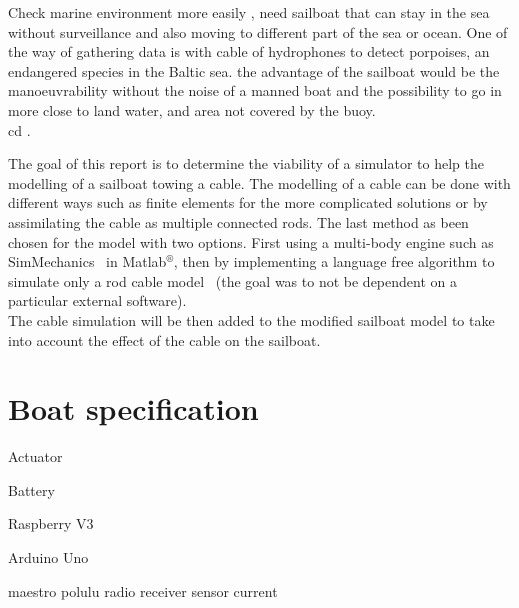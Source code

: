 Check marine environment more easily , need sailboat that can stay in the sea without surveillance 
and also moving to different part of the sea or ocean. One of the way of gathering data is with cable of 
hydrophones to detect porpoises, an endangered species in the Baltic sea. the advantage of the sailboat would be the manoeuvrability without the noise of a manned boat and the possibility to go in more close to land water, and area not covered by the buoy.\\
cd .


The goal of this report is to determine the viability of a simulator to help
the modelling of a sailboat towing a cable. The modelling of a cable can be done
with different ways such as finite elements for the more complicated solutions or by assimilating the cable
as multiple connected rods. The last method as been chosen for the model with two options. First using 
a multi-body engine such as SimMechanics\texttrademark~ in Matlab$^{\circledR}$, then by implementing a language free algorithm to simulate
only a rod cable model~\cite{johansen2007modelling} (the goal was to not be dependent on a particular external software).\\
The cable simulation will be then added to the modified sailboat model to take into account the effect of
the cable on the sailboat.

\section*{Boat specification}

Actuator

Battery

Raspberry V3

Arduino Uno 

maestro polulu
 radio receiver
 sensor current
 
 
